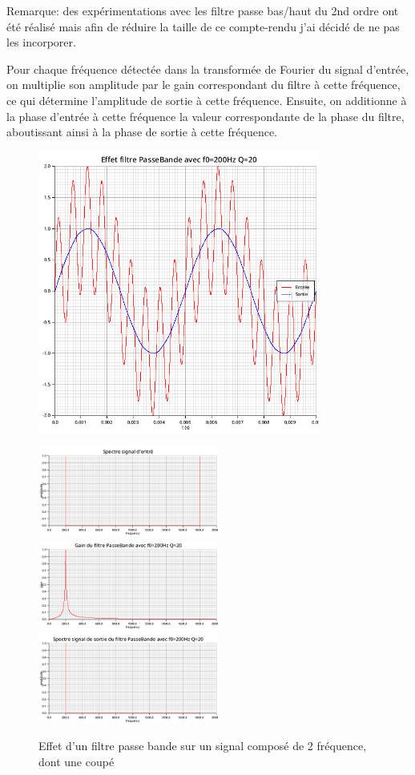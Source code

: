 \documentclass{article}
\begin{document}
Remarque: des expérimentations avec les filtre passe bas/haut du 2nd ordre ont été réalisé mais afin de réduire la taille de ce compte-rendu j'ai décidé de ne pas les incorporer.

Pour chaque fréquence détectée dans la transformée de Fourier du signal d'entrée, on multiplie son amplitude par le gain correspondant du filtre à cette fréquence, ce qui détermine l'amplitude de sortie à cette fréquence. Ensuite, on additionne à la phase d'entrée à cette fréquence la valeur correspondante de la phase du filtre, aboutissant ainsi à la phase de sortie à cette fréquence.

\begin{figure}[H]
  \begin{minipage}{0.6\textwidth}
      \centering
      \includegraphics[width=25em]{images/custom/filtrage_test/signals.png}
  \end{minipage}
  \begin{minipage}{0.3\textwidth}
      \centering
      \includegraphics[width=16em]{images/custom/filtrage_test/fft_in.png}
      \vfill
      \includegraphics[width=16em]{images/custom/filtrage_test/gain.png}
      \vfill
      \includegraphics[width=16em]{images/custom/filtrage_test/fft_out.png}
  \end{minipage}
  \caption{Effet d'un filtre passe bande sur un signal composé de 2 fréquence, dont une coupé}
\end{figure}
\end{document}

